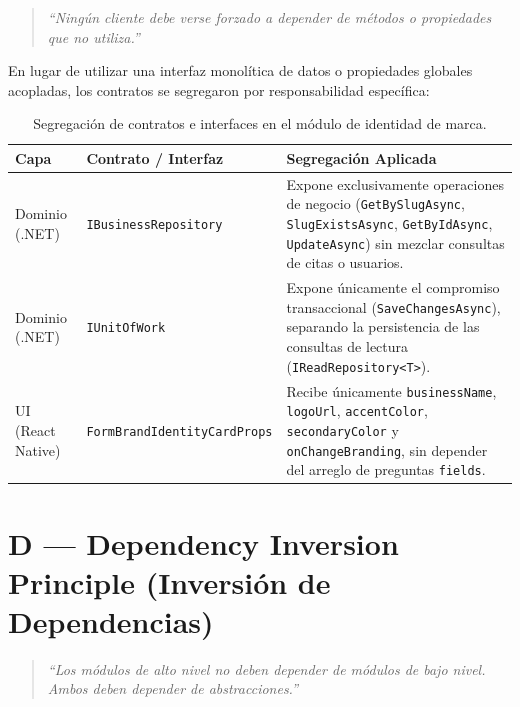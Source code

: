 \documentclass[11pt,a4paper]{article}
\begin{document}
\begin{quote}
\textit{``Ningún cliente debe verse forzado a depender de métodos o propiedades que no utiliza.''}
\end{quote}

En lugar de utilizar una interfaz monolítica de datos o propiedades globales acopladas, los contratos se segregaron por responsabilidad específica:

\begin{table}[h!]
\centering
\renewcommand{\arraystretch}{1.35}
\begin{tabularx}{\textwidth}{l l X}
\toprule
\textbf{Capa} & \textbf{Contrato / Interfaz} & \textbf{Segregación Aplicada} \\
\midrule
Dominio (.NET) & \texttt{IBusinessRepository} & Expone exclusivamente operaciones de negocio (\texttt{GetBySlugAsync}, \texttt{SlugExistsAsync}, \texttt{GetByIdAsync}, \texttt{UpdateAsync}) sin mezclar consultas de citas o usuarios. \\
Dominio (.NET) & \texttt{IUnitOfWork} & Expone únicamente el compromiso transaccional (\texttt{SaveChangesAsync}), separando la persistencia de las consultas de lectura (\texttt{IReadRepository<T>}). \\
UI (React Native) & \texttt{FormBrandIdentityCardProps} & Recibe únicamente \texttt{businessName}, \texttt{logoUrl}, \texttt{accentColor}, \texttt{secondaryColor} y \texttt{onChangeBranding}, sin depender del arreglo de preguntas \texttt{fields}. \\
\bottomrule
\end{tabularx}
\caption{Segregación de contratos e interfaces en el módulo de identidad de marca.}
\end{table}

\section{D --- Dependency Inversion Principle (Inversión de Dependencias)}

\begin{quote}
\textit{``Los módulos de alto nivel no deben depender de módulos de bajo nivel. Ambos deben depender de abstracciones.''}
\end{quote}
\end{document}
